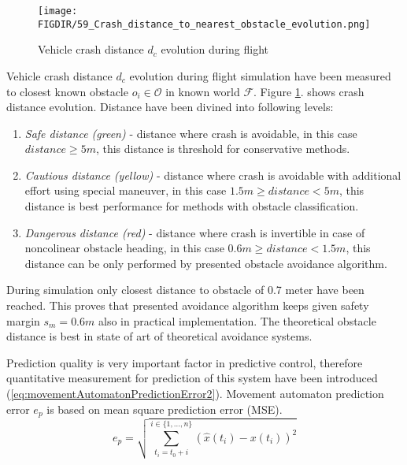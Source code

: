 \begin{figure}[H]
    \centering
    \texttt{[image: \\FIGDIR/59\_Crash\_distance\_to\_nearest\_obstacle\_evolution.png]}
    \caption{Vehicle crash distance $d_c$ evolution during flight}
    \label{fig:vehicleCrashDistanceEvolution}
\end{figure}
\noindent Vehicle crash distance $d_c$ evolution during flight simulation have been measured to closest known obstacle $o_i\in\mathscr{O}$ in known world $\mathscr{F}$.  Figure \ref{fig:vehicleCrashDistanceEvolution}. shows crash distance evolution. Distance have been divined into following levels:
\begin{enumerate}
    \item \textit{Safe distance (green)} - distance where crash is avoidable, in this case $distance \ge 5 m$, this distance is threshold for conservative methods. 
    \item \textit{Cautious distance (yellow)} - distance where crash is avoidable with additional effort using special maneuver, in this case $1.5m \ge distance < 5m$, this distance is best performance for methods with obstacle classification.
    \item \textit{Dangerous distance (red)} - distance where crash is invertible in case of noncolinear obstacle heading, in this case $0.6m \ge distance < 1.5m$, this distance can be only performed by presented obstacle avoidance algorithm.
\end{enumerate}
\noindent During simulation only closest distance to obstacle of 0.7 meter have been reached. This proves that presented avoidance algorithm keeps given safety margin $s_m=0.6 m$ also in practical implementation. The theoretical obstacle distance is best in state of art of theoretical avoidance systems.

Prediction quality is very important factor in predictive control, therefore quantitative measurement for prediction of this system have been introduced (\ref{eq:movementAutomatonPredictionError2}). Movement automaton prediction error $e_p$ is based on mean square prediction error (MSE).
\begin{equation}\label{eq:movementAutomatonPredictionError2}
    e_p=\sqrt{\sum_{t_i=t_0+i}^{i\in\{1,\dots,n\}} \left (\hat{x}(t_i)-x(t_i)\right)^2}    
\end{equation}

